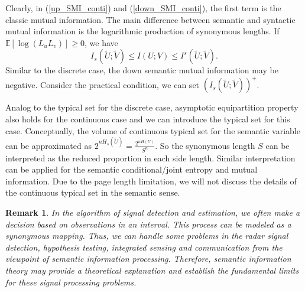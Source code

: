 \documentclass[12pt, draftclsnofoot,onecolumn]{IEEEtran}
\newtheorem{remark}{\bf{Remark}}
\begin{document}
Clearly, in (\ref{up_SMI_conti}) and (\ref{down_SMI_conti}), the first term is the classic mutual information. The main difference between semantic and syntactic mutual information is the logarithmic production of synonymous lengths. If $\mathbb{E}\left[\log (L_u L_v)\right]\geq 0$, we have
\begin{equation}
I_s(\tilde{U};\tilde{V}) \leq I(U;V) \leq I^s(\tilde{U};\tilde{V}).
\end{equation}
Similar to the discrete case, the down semantic mutual information may be negative. Consider the practical condition, we can set $(I_s(\tilde{U};\tilde{V}) )^{+}$.

Analog to the typical set for the discrete case, asymptotic equipartition property also holds for the continuous case and we can introduce the typical set for this case. Conceptually, the volume of continuous typical set for the semantic variable can be approximated as $2^{nH_s(\tilde{U})}=\frac{2^{nH(U)}}{S^n}$. So the synonymous length $S$ can be interpreted as the reduced proportion in each side length. Similar interpretation can be applied for the semantic conditional/joint entropy and mutual information. Due to the page length limitation, we will not discuss the details of the continuous typical set in the semantic sense.

\begin{remark}
In the algorithm of signal detection and estimation, we often make a decision based on observations in an interval. This process can be modeled as a synonymous mapping. Thus, we can handle some problems in the radar signal detection, hypothesis testing, integrated sensing and communication from the viewpoint of semantic information processing. Therefore, semantic information theory may provide a theoretical explanation and establish the fundamental limits for these signal processing problems.
\end{remark}
\end{document}
